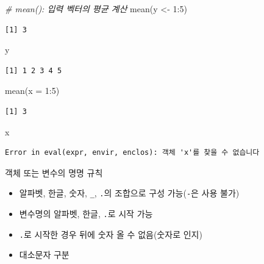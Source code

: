 \documentclass[
  11pt,
]{krantz}
\newenvironment{Shaded}{\begin{snugshade}}{\end{snugshade}}
\newcommand{\AttributeTok}[1]{\textcolor[rgb]{0.61,0.61,0.61}{#1}}
\newcommand{\CommentTok}[1]{\textcolor[rgb]{0.37,0.37,0.37}{\textit{#1}}}
\newcommand{\DecValTok}[1]{\textcolor[rgb]{0.06,0.06,0.06}{#1}}
\newcommand{\FunctionTok}[1]{\textcolor[rgb]{0,0,0}{#1}}
\newcommand{\NormalTok}[1]{#1}
\newcommand{\OtherTok}[1]{\textcolor[rgb]{0.37,0.37,0.37}{#1}}
\newcommand{\SpecialCharTok}[1]{\textcolor[rgb]{0,0,0}{#1}}
\providecommand{\tightlist}{%
  \setlength{\itemsep}{0pt}\setlength{\parskip}{0pt}}
\begin{document}
\footnotesize

\begin{Shaded}
\begin{Highlighting}[]
\CommentTok{\# mean(): 입력 벡터의 평균 계산}
\FunctionTok{mean}\NormalTok{(y }\OtherTok{\textless{}{-}} \DecValTok{1}\SpecialCharTok{:}\DecValTok{5}\NormalTok{)}
\end{Highlighting}
\end{Shaded}

\begin{verbatim}
[1] 3
\end{verbatim}

\begin{Shaded}
\begin{Highlighting}[]
\NormalTok{y}
\end{Highlighting}
\end{Shaded}

\begin{verbatim}
[1] 1 2 3 4 5
\end{verbatim}

\begin{Shaded}
\begin{Highlighting}[]
\FunctionTok{mean}\NormalTok{(}\AttributeTok{x =} \DecValTok{1}\SpecialCharTok{:}\DecValTok{5}\NormalTok{)}
\end{Highlighting}
\end{Shaded}

\begin{verbatim}
[1] 3
\end{verbatim}

\begin{Shaded}
\begin{Highlighting}[]
\NormalTok{x}
\end{Highlighting}
\end{Shaded}

\begin{verbatim}
Error in eval(expr, envir, enclos): 객체 'x'를 찾을 수 없습니다
\end{verbatim}

\normalsize

객체 또는 변수의 명명 규칙

\begin{itemize}
\tightlist
\item
  알파벳, 한글, 숫자, \texttt{\_}, \texttt{.}의 조합으로 구성 가능(\texttt{-}은 사용 불가)
\item
  변수명의 알파벳, 한글, \texttt{.}로 시작 가능
\item
  \texttt{.}로 시작한 경우 뒤에 숫자 올 수 없음(숫자로 인지)
\item
  대소문자 구분
\end{itemize}
\end{document}
